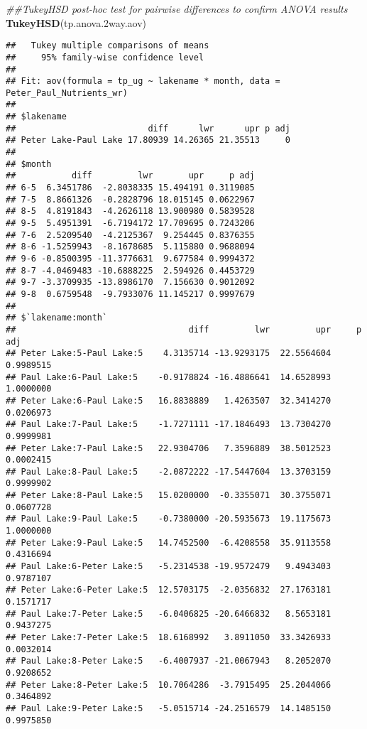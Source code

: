 \documentclass[]{article}
\newenvironment{Shaded}{\begin{snugshade}}{\end{snugshade}}
\newcommand{\CommentTok}[1]{\textcolor[rgb]{0.56,0.35,0.01}{\textit{#1}}}
\newcommand{\FloatTok}[1]{\textcolor[rgb]{0.00,0.00,0.81}{#1}}
\newcommand{\KeywordTok}[1]{\textcolor[rgb]{0.13,0.29,0.53}{\textbf{#1}}}
\newcommand{\NormalTok}[1]{#1}
\begin{document}
\begin{Shaded}
\begin{Highlighting}[]
\CommentTok{##TukeyHSD post-hoc test for pairwise differences to confirm ANOVA results}
\KeywordTok{TukeyHSD}\NormalTok{(tp.anova}\FloatTok{.2}\NormalTok{way.aov)}
\end{Highlighting}
\end{Shaded}

\begin{verbatim}
##   Tukey multiple comparisons of means
##     95% family-wise confidence level
## 
## Fit: aov(formula = tp_ug ~ lakename * month, data = Peter_Paul_Nutrients_wr)
## 
## $lakename
##                          diff      lwr      upr p adj
## Peter Lake-Paul Lake 17.80939 14.26365 21.35513     0
## 
## $month
##           diff         lwr       upr     p adj
## 6-5  6.3451786  -2.8038335 15.494191 0.3119085
## 7-5  8.8661326  -0.2828796 18.015145 0.0622967
## 8-5  4.8191843  -4.2626118 13.900980 0.5839528
## 9-5  5.4951391  -6.7194172 17.709695 0.7243206
## 7-6  2.5209540  -4.2125367  9.254445 0.8376355
## 8-6 -1.5259943  -8.1678685  5.115880 0.9688094
## 9-6 -0.8500395 -11.3776631  9.677584 0.9994372
## 8-7 -4.0469483 -10.6888225  2.594926 0.4453729
## 9-7 -3.3709935 -13.8986170  7.156630 0.9012092
## 9-8  0.6759548  -9.7933076 11.145217 0.9997679
## 
## $`lakename:month`
##                                  diff         lwr         upr     p adj
## Peter Lake:5-Paul Lake:5    4.3135714 -13.9293175  22.5564604 0.9989515
## Paul Lake:6-Paul Lake:5    -0.9178824 -16.4886641  14.6528993 1.0000000
## Peter Lake:6-Paul Lake:5   16.8838889   1.4263507  32.3414270 0.0206973
## Paul Lake:7-Paul Lake:5    -1.7271111 -17.1846493  13.7304270 0.9999981
## Peter Lake:7-Paul Lake:5   22.9304706   7.3596889  38.5012523 0.0002415
## Paul Lake:8-Paul Lake:5    -2.0872222 -17.5447604  13.3703159 0.9999902
## Peter Lake:8-Paul Lake:5   15.0200000  -0.3355071  30.3755071 0.0607728
## Paul Lake:9-Paul Lake:5    -0.7380000 -20.5935673  19.1175673 1.0000000
## Peter Lake:9-Paul Lake:5   14.7452500  -6.4208558  35.9113558 0.4316694
## Paul Lake:6-Peter Lake:5   -5.2314538 -19.9572479   9.4943403 0.9787107
## Peter Lake:6-Peter Lake:5  12.5703175  -2.0356832  27.1763181 0.1571717
## Paul Lake:7-Peter Lake:5   -6.0406825 -20.6466832   8.5653181 0.9437275
## Peter Lake:7-Peter Lake:5  18.6168992   3.8911050  33.3426933 0.0032014
## Paul Lake:8-Peter Lake:5   -6.4007937 -21.0067943   8.2052070 0.9208652
## Peter Lake:8-Peter Lake:5  10.7064286  -3.7915495  25.2044066 0.3464892
## Paul Lake:9-Peter Lake:5   -5.0515714 -24.2516579  14.1485150 0.9975850

\end{verbatim}
\end{document}
